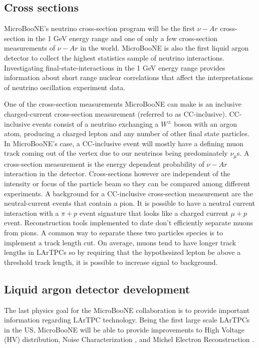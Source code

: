 \subsection{Cross sections}
MicroBooNE's neutrino cross-section program will be the first $\nu-Ar$ cross-section in the 1 GeV energy range and one of only a few cross-section measurements of $\nu-Ar$ in the world. MicroBooNE is also the first liquid argon detector to collect the highest statistics sample of neutrino interactions. Investigating final-state-interactions in the 1 GeV energy range provides information about short range nuclear correlations that affect the interpretations of neutrino oscillation experiment data. 

One of the cross-section measurements MicroBooNE can make is an inclusive charged-current cross-section measurement (referred to as CC-inclusive). CC-inclusive events consist of a neutrino exchanging a $W^{\pm}$ boson with an argon atom, producing a charged lepton and any number of other final state particles. In MicroBooNE's case, a CC-inclusive event will mostly have a defining muon track coming out of the vertex due to our neutrinos being predominately $\nu_{\mu}$s. A cross-section measurement is the energy dependent probability of $\nu-Ar$ interaction in the detector. Cross-sections however are independent of the intensity or focus of the particle beam so they can be compared among different experiments. A background for a CC-inclusive cross-section measurement are the neutral-current events that contain a pion. It is possible to have a neutral current interaction with a $\pi+p$ event signature that looks like a charged current $\mu+p$ event. Reconstruction tools implemented to date don't efficiently separate muons from pions. A common way to separate these two particles species is to implement a track length cut. On average, muons tend to have longer track lengths in LArTPCs so by requiring that the hypothesized lepton be above a threshold track length, it is possible to increase signal to background.

\subsection{Liquid argon detector development}
The last physics goal for the MicroBooNE collaboration is to provide important information regarding LArTPC technology. Being the first large scale LArTPCs in the US, MicroBooNE will be able to provide improvements to High Voltage (HV) distribution, Noise Characterization \cite{noisechar}, and Michel Electron Reconstruction \cite{michel}. 

